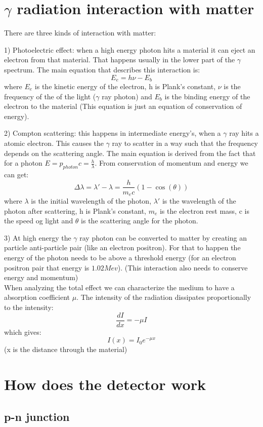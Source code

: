 \documentclass[]{article}
\begin{document}
\section{$\gamma$ radiation interaction with matter}

There are three kinds of interaction with matter:

1) Photoelectric effect: when a high energy photon hits a material it can eject an electron from that material. That happens usually in the lower part of the $\gamma$ spectrum. The main equation that describes this interaction is: $$E_e=h\nu-E_b$$ where $E_e$ is the kinetic energy of the electron, h is Plank's constant, $\nu$ is the frequency of the of the light ($\gamma$ ray photon) and $E_b$ is the binding energy of the electron to the material (This equation is just an equation of conservation of energy).

2) Compton scattering: this happens in intermediate energy's, when a $\gamma$ ray hits a atomic electron. This causes the $\gamma$ ray to scatter in a way such that the frequency depends on the scattering angle. The main equation is derived from the fact that for a photon $E=p_{photon}c=\frac{h}{\lambda}$. From conservation of momentum and energy we can get: $$\Delta \lambda =\lambda '-\lambda=\frac{h}{m_ec}(1-\cos(\theta))$$ where $\lambda$ is the initial wavelength of the photon, $\lambda'$ is the wavelength of the photon after scattering, h is Plank's constant, $m_e$ is the electron rest mass, c is the speed og light and $\theta$ is the scattering angle for the photon.

3) At high energy the $\gamma$ ray photon can be converted to matter by creating an particle anti-particle pair (like an electron positron). For that to happen the energy of the photon needs to be above a threshold energy (for an electron positron pair that energy is $1.02Mev$). (This interaction also needs to conserve energy and momentum)\\ 
When analyzing the total effect we can characterize the medium to have a absorption coefficient $\mu$. The intensity of the radiation dissipates proportionally to the intensity: $$\frac{dI}{dx}=-\mu I$$ which gives: $$I(x)=I_0e^{-\mu x}$$ (x is the distance through the material)

\section{How does the detector work}
\subsection{p-n junction}
\end{document}
